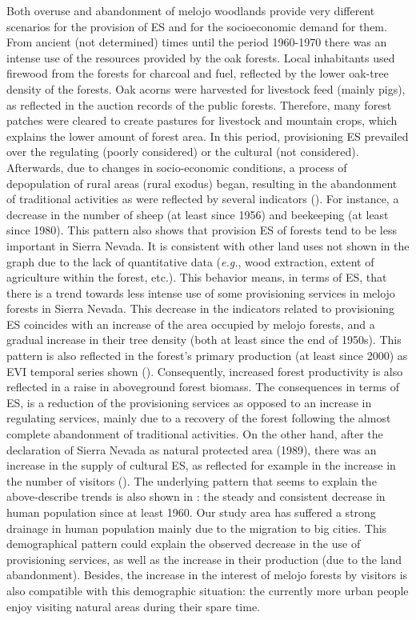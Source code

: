 Both overuse and abandonment of melojo woodlands provide very different scenarios for the provision of ES and for the socioeconomic demand for them. From ancient (not determined) times until the period 1960-1970 there was an intense use of the resources provided by the oak forests. Local inhabitants used firewood from the forests for charcoal and fuel, reflected by the lower oak-tree density of the forests. Oak acorns were harvested for livestock feed (mainly pigs), as reflected in the auction records of the public forests. Therefore, many forest patches were cleared to create pastures for livestock and mountain crops, which explains the lower amount of forest area. In this period, provisioning ES prevailed over the regulating (poorly considered) or the cultural (not considered). Afterwards, due to changes in socio-economic conditions, a process of depopulation of rural areas (rural exodus) began, resulting in the abandonment of traditional activities as were reflected by several indicators (). For instance, a decrease in the number of sheep (at least since 1956) and beekeeping (at least since 1980). This pattern also shows that provision ES of \Qp forests tend to be less important in Sierra Nevada. It is consistent with other land uses not shown in the graph due to the lack of quantitative data (\emph{e.g.}, wood extraction, extent of agriculture within the forest, etc.). This behavior means, in terms of ES, that there is a trend towards less intense use of some provisioning services in melojo forests in Sierra Nevada. This decrease in the indicators related to provisioning ES coincides with an increase of the area occupied by melojo forests, and a gradual increase in their tree density (both at least since the end of 1950s). This pattern is also reflected in the forest’s primary production (at least since 2000) as EVI temporal series shown (). Consequently, increased forest productivity is also reflected in a raise in aboveground forest biomass. The consequences in terms of ES, is a reduction of the provisioning services as opposed to an increase in regulating services, mainly due to a recovery of the forest following the almost complete abandonment of traditional activities. On the other hand, after the declaration of Sierra Nevada as natural protected area (1989), there was an increase in the supply of cultural ES, as reflected for example in the increase in the number of visitors (). The underlying pattern that seems to explain the above-describe trends is also shown in : the steady and consistent decrease in human population since at least 1960. Our study area has suffered a strong drainage in human population mainly due to the migration to big cities. This demographical pattern could explain the observed decrease in the use of provisioning services, as well as the increase in their production (due to the land abandonment). Besides, the increase in the interest of melojo forests by visitors is also compatible with this demographic situation: the currently more urban people enjoy visiting natural areas during their spare time. 

